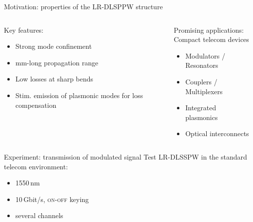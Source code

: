   \begin{frame}{Motivation: properties of the LR-DLSPPW structure}
    \vspace{-3mm}
    \begin{columns}
        \begin{block}{Key features:}
          \begin{itemize}
            \item Strong mode confinement%
            \item mm-long propagation range
            \item Low losses at sharp bends
            \item Stim. emission of plasmonic modes for loss compensation
          \end{itemize}
        \end{block}
        \begin{block}{Promising applications:\\
                      Compact telecom devices}
          \begin{itemize}
            \item Modulators / Resonators
            \item Couplers / Multiplexers
            \item Integrated plasmonics
            \item Optical interconnects
          \end{itemize}
        \end{block}
    \end{columns}
    \pause
    \begin{center}
      \begin{minipage}{0.8\textwidth}
        \begin{alertblock}{Experiment: transmission of modulated signal}
          Test LR-DLSSPW in the standard telecom environment:
          \begin{itemize}
            \item 1550\,nm
            \item 10\,Gbit/s, \textsc{on-off} keying
            \item several channels
          \end{itemize}
        \end{alertblock}
      \end{minipage}
    \end{center}
  \end{frame}


